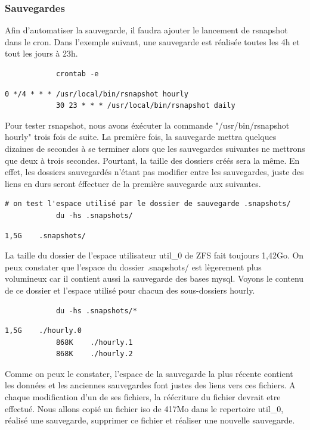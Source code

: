 \documentclass[a4paper]{report}
\begin{document}
		\subsubsection{Sauvegardes}
		Afin d'automatiser la sauvegarde, il faudra ajouter le lancement de rsnapshot dans le cron. Dans l'exemple suivant, une sauvegarde est réalisée toutes les 4h et tout les jours à 23h.
		\begin{lstlisting}
			crontab -e
		\end{lstlisting}
		\begin{lstlisting}[backgroundcolor=\color{yellow}]
			0 */4 * * * /usr/local/bin/rsnapshot hourly
			30 23 * * * /usr/local/bin/rsnapshot daily
		\end{lstlisting}
		Pour tester rsnapshot, nous avons éxécuter la commande "/usr/bin/rsnapshot hourly" trois fois de suite. La première fois, la sauvegarde mettra quelques dizaines de secondes à se terminer alors que les sauvegardes suivantes ne mettrons que deux à trois secondes. Pourtant, la taille des dossiers créés sera la même. En effet, les dossiers sauvegardés n'étant pas modifier entre les sauvegardes, juste des liens en durs seront éffectuer de la première sauvegarde aux suivantes.
		\begin{lstlisting}[texcl]
			# on test l'espace utilisé par le dossier de sauvegarde .snapshots/
			du -hs .snapshots/
		\end{lstlisting}
		\begin{lstlisting}[backgroundcolor=\color{yellow}]
			1,5G	.snapshots/
		\end{lstlisting}
		La taille du dossier de l'espace utilisateur util\_0 de ZFS fait toujours 1,42Go. On peux constater que l'espace du dossier .snapshots/ est lègerement plus volumineux car il contient aussi la sauvegarde des bases mysql. Voyons le contenu de ce dossier et l'espace utilisé pour chacun des sous-dossiers hourly.
		\begin{lstlisting}
			du -hs .snapshots/*
		\end{lstlisting}
		\begin{lstlisting}[backgroundcolor=\color{yellow}]
			1,5G	./hourly.0
			868K	./hourly.1
			868K	./hourly.2
		\end{lstlisting}
		Comme on peux le constater, l'espace de la sauvegarde la plus récente contient les données et les anciennes sauvegardes font justes des liens vers ces fichiers. A chaque modification d'un de ses fichiers, la réécriture du fichier devrait etre effectué. Nous allons copié un fichier iso de 417Mo dans le repertoire util\_0, réalisé une sauvegarde, supprimer ce fichier et réaliser une nouvelle sauvegarde.
\end{document}

